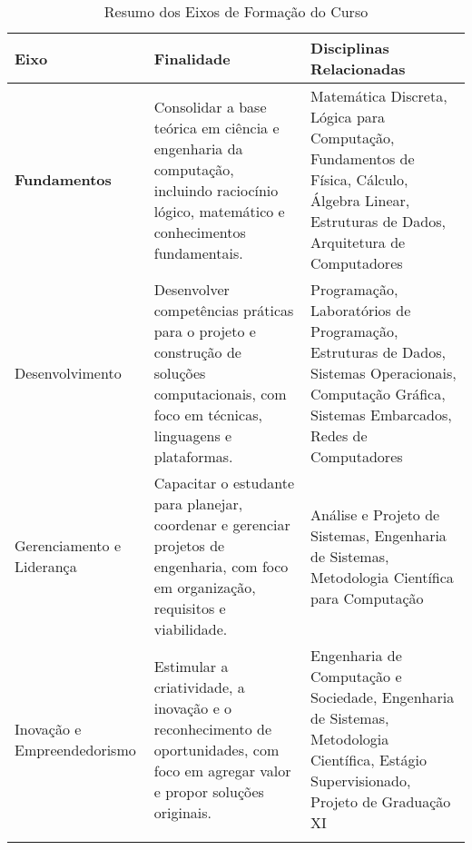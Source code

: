 \begin{table}[ht]
  \centering
  \caption{Resumo dos Eixos de Formação do Curso}
  \begin{tabularx}{\textwidth}{>{\bfseries}l X X}
    \toprule
    \textbf{Eixo}                                                                                                                                      & \textbf{Finalidade} & \textbf{Disciplinas Relacionadas} \\
    \midrule
    Fundamentos                                                                                                                                        &
    Consolidar a base teórica em ciência e engenharia da computação, incluindo raciocínio lógico, matemático e conhecimentos fundamentais.             &
    Matemática Discreta, Lógica para Computação, Fundamentos de Física, Cálculo, Álgebra Linear, Estruturas de Dados, Arquitetura de Computadores                                                                \\
    \addlinespace

    Desenvolvimento                                                                                                                                    &
    Desenvolver competências práticas para o projeto e construção de soluções computacionais, com foco em técnicas, linguagens e plataformas.          &
    Programação, Laboratórios de Programação, Estruturas de Dados, Sistemas Operacionais, Computação Gráfica, Sistemas Embarcados, Redes de Computadores                                                         \\
    \addlinespace

    Gerenciamento e Liderança                                                                                                                          &
    Capacitar o estudante para planejar, coordenar e gerenciar projetos de engenharia, com foco em organização, requisitos e viabilidade.              &
    Análise e Projeto de Sistemas, Engenharia de Sistemas, Metodologia Científica para Computação                                                                                                                \\
    \addlinespace

    Inovação e Empreendedorismo                                                                                                                        &
    Estimular a criatividade, a inovação e o reconhecimento de oportunidades, com foco em agregar valor e propor soluções originais.                   &
    Engenharia de Computação e Sociedade, Engenharia de Sistemas, Metodologia Científica, Estágio Supervisionado, Projeto de Graduação XI                                                                        \\
    \addlinespace


\end{tabularx}
\end{table}
